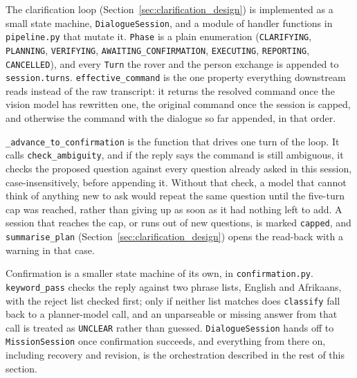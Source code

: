 \label{sec:orchestration}

\label{sec:clarification_impl}

The clarification loop (Section~\ref{sec:clarification_design}) is implemented as
a small state machine, \texttt{DialogueSession}, and a module of handler
functions in \texttt{pipeline.py} that mutate it. \texttt{Phase} is a plain
enumeration (\texttt{CLARIFYING}, \texttt{PLANNING}, \texttt{VERIFYING},
\texttt{AWAITING\_CONFIRMATION}, \texttt{EXECUTING}, \texttt{REPORTING},
\texttt{CANCELLED}), and every \texttt{Turn} the rover and the person exchange is
appended to \texttt{session.turns}. \texttt{effective\_command} is the one
property everything downstream reads instead of the raw transcript: it returns
the resolved command once the vision model has rewritten one, the original
command once the session is capped, and otherwise the command with the
dialogue so far appended, in that order.

\texttt{\_advance\_to\_confirmation} is the function that drives one turn of the
loop. It calls \texttt{check\_ambiguity}, and if the reply says the command is
still ambiguous, it checks the proposed question against every question already
asked in this session, case-insensitively, before appending it. Without that
check, a model that cannot think of anything new to ask would repeat the same
question until the five-turn cap was reached, rather than giving up as soon as it
had nothing left to add. A session that reaches the cap, or runs out of new
questions, is marked \texttt{capped}, and \texttt{summarise\_plan}
(Section~\ref{sec:clarification_design}) opens the read-back with a warning in
that case.

Confirmation is a smaller state machine of its own, in \texttt{confirmation.py}.
\texttt{keyword\_pass} checks the reply against two phrase lists, English and
Afrikaans, with the reject list checked first; only if neither list matches does
\texttt{classify} fall back to a planner-model call, and an unparseable or
missing answer from that call is treated as \texttt{UNCLEAR} rather than guessed.
\texttt{DialogueSession} hands off to \texttt{MissionSession} once confirmation
succeeds, and everything from there on, including recovery and revision, is the
orchestration described in the rest of this section.


